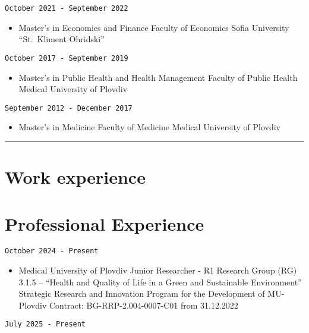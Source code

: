 \documentclass[
  12pt,
  letterpaper,
  DIV=11,
  numbers=noendperiod]{scrartcl}
\providecommand{\tightlist}{%
  \setlength{\itemsep}{0pt}\setlength{\parskip}{0pt}}\usepackage{longtable,booktabs,array}
\begin{document}
\texttt{October\ 2021\ -\ September\ 2022}

\begin{itemize}
\tightlist
\item
  Master's in Economics and Finance \textbar{} Faculty of Economics
  \textbar{} Sofia University ``St.~Kliment Ohridski''
\end{itemize}

\texttt{October\ 2017\ -\ September\ 2019}

\begin{itemize}
\tightlist
\item
  Master's in Public Health and Health Management \textbar{} Faculty of
  Public Health \textbar{} Medical University of Plovdiv
\end{itemize}

\texttt{September\ 2012\ -\ December\ 2017}

\begin{itemize}
\tightlist
\item
  Master's in Medicine \textbar{} Faculty of Medicine \textbar{} Medical
  University of Plovdiv
\end{itemize}

\begin{center}\rule{0.5\linewidth}{0.5pt}\end{center}

\section{Work experience}\label{work-experience}

\section{Professional Experience}\label{professional-experience}

\texttt{October\ 2024\ -\ Present}

\begin{itemize}
\tightlist
\item
  Medical University of Plovdiv \textbar{} Junior Researcher - R1
  \textbar{} Research Group (RG) 3.1.5 -- ``Health and Quality of Life
  in a Green and Sustainable Environment'' \textbar{} Strategic Research
  and Innovation Program for the Development of MU-Plovdiv \textbar{}
  Contract: BG-RRP-2.004-0007-C01 from 31.12.2022
\end{itemize}

\texttt{July\ 2025\ -\ Present}
\end{document}

